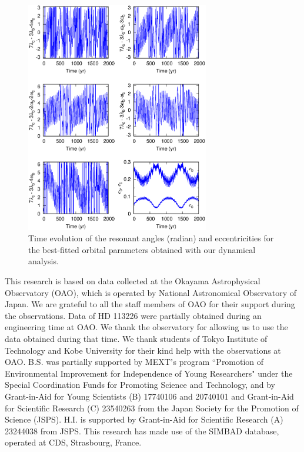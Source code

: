 \documentclass[]{pasj01}
\begin{document}
\begin{figure}
\begin{center}
\includegraphics[width=8cm]{psy_best.ps}
\end{center}
\caption{Time evolution of the resonant angles (radian) and eccentricities for the best-fitted orbital parameters obtained with our dynamical analysis.}
\label{fig:libration1}
\end{figure}
\bigskip
\begin{ack}
This research is based on data collected at the Okayama Astrophysical Observatory (OAO), which is operated by National Astronomical Observatory of Japan. 
We are grateful to all the staff members of OAO for their support during the observations.
Data of HD 113226 were partially obtained during an engineering time at OAO. 
We thank the observatory for allowing us to use the data obtained during that time.
We thank students of Tokyo Institute of Technology and Kobe University for their kind help with the observations at OAO. 
B.S. was partially supported by MEXTʼs program ``Promotion of Environmental Improvement for Independence of Young Researchers" under the Special Coordination Funds for Promoting Science and Technology, and by Grant-in-Aid for Young Scientists (B) 17740106 and 20740101 and Grant-in-Aid for Scientific Research (C) 23540263 from the Japan Society for the Promotion of Science (JSPS). 
H.I. is supported by Grant-in-Aid for Scientific Research (A) 23244038 from JSPS. 
This research has made use of the SIMBAD database, operated at CDS, Strasbourg, France.
\end{ack}
\end{document}
